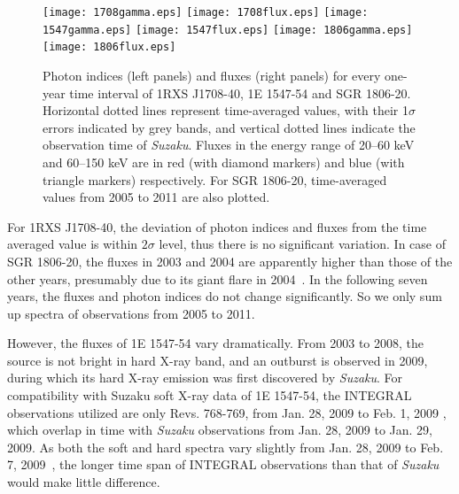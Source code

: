 \documentclass[]{raa}
\begin{document}
\begin{figure}
   \centering
     \texttt{[image: 1708gamma.eps]}
     \texttt{[image: 1708flux.eps]}
     \texttt{[image: 1547gamma.eps]}
     \texttt{[image: 1547flux.eps]}
     \texttt{[image: 1806gamma.eps]}
     \texttt{[image: 1806flux.eps]}

   \caption{Photon indices (left panels) and fluxes (right panels) for every one-year time interval of 1RXS J1708-40, 1E 1547-54 and SGR 1806-20. Horizontal dotted lines represent time-averaged values, with their 1$\sigma$ errors indicated by grey bands, and vertical dotted lines indicate the observation time of {\it Suzaku}. Fluxes in the energy range of 20--60 keV and 60--150 keV are in red (with diamond markers) and blue (with triangle markers) respectively. For SGR 1806-20, time-averaged values from 2005 to 2011 are also plotted.}
   \label{fvar}
   \end{figure}


For 1RXS J1708-40, 
%
the deviation of photon indices and fluxes from the time averaged value is within $2\sigma$ level, thus there is no significant variation.
%
In case of SGR 1806-20, the fluxes in 2003 and 2004 are apparently higher than those of the other years, presumably due to its giant flare in 2004~\citep{Hurley05}.
%
In the following seven years, the fluxes and photon indices do not change significantly.
%
So we only sum up spectra of observations from 2005 to 2011.
%

However, the fluxes of 1E 1547-54 vary dramatically.
%
From 2003 to 2008, the source is not bright in hard X-ray band, %
and an outburst is observed in 2009, during which its hard X-ray emission was first discovered by {\it Suzaku}. %
%
For compatibility with Suzaku soft X-ray data of 1E 1547-54, the INTEGRAL observations utilized are only Revs. 768-769, from Jan. 28, 2009 %
to Feb. 1, 2009 %
, which overlap in time with {\it Suzaku} observations from Jan. 28, 2009 
to Jan. 29, 2009. %
%
As both the soft and hard spectra vary slightly from Jan. 28, 2009 to Feb. 7, 2009~\citep{Bernardini11}, the longer time span of INTEGRAL observations than that of {\it Suzaku} would make little difference.
\end{document}
